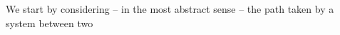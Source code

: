 \documentclass[letterpaper,12pt,preprint]{aastex}
\begin{document}

We start by considering -- in the most abstract sense -- the path taken by a system between two 
\end{document}
